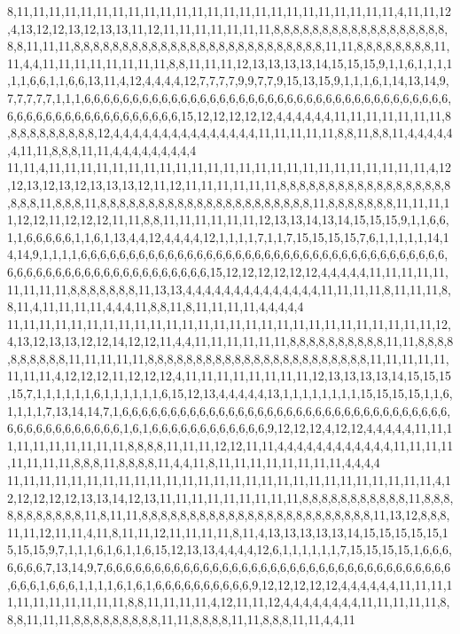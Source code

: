 8,11,11,11,11,11,11,11,11,11,11,11,11,11,11,11,11,11,11,11,11,11,11,11,11,4,11,11,12,4,13,12,12,13,12,13,13,11,12,11,11,11,11,11,11,11,8,8,8,8,8,8,8,8,8,8,8,8,8,8,8,8,8,8,8,8,11,11,11,8,8,8,8,8,8,8,8,8,8,8,8,8,8,8,8,8,8,8,8,8,8,8,8,8,8,11,11,8,8,8,8,8,8,8,8,11,11,4,4,11,11,11,11,11,11,11,11,8,8,11,11,11,12,13,13,13,13,14,15,15,15,9,1,1,6,1,1,1,1,1,1,6,6,1,1,6,6,13,11,4,12,4,4,4,4,12,7,7,7,7,9,9,7,7,9,15,13,15,9,1,1,1,6,1,14,13,14,9,7,7,7,7,7,1,1,1,6,6,6,6,6,6,6,6,6,6,6,6,6,6,6,6,6,6,6,6,6,6,6,6,6,6,6,6,6,6,6,6,6,6,6,6,6,6,6,6,6,6,6,6,6,6,6,6,6,6,6,6,6,6,6,6,15,12,12,12,12,12,4,4,4,4,4,4,11,11,11,11,11,11,11,8,8,8,8,8,8,8,8,8,8,12,4,4,4,4,4,4,4,4,4,4,4,4,4,4,4,11,11,11,11,11,8,8,11,8,8,11,4,4,4,4,4,4,11,11,8,8,8,11,11,4,4,4,4,4,4,4,4,4
11,11,4,11,11,11,11,11,11,11,11,11,11,11,11,11,11,11,11,11,11,11,11,11,11,11,11,4,12,12,13,12,13,12,13,13,13,12,11,12,11,11,11,11,11,11,8,8,8,8,8,8,8,8,8,8,8,8,8,8,8,8,8,8,8,8,8,11,8,8,8,11,8,8,8,8,8,8,8,8,8,8,8,8,8,8,8,8,8,8,8,8,8,8,11,8,8,8,8,8,8,8,11,11,11,11,12,12,11,12,12,12,11,11,8,8,11,11,11,11,11,11,12,13,13,14,13,14,15,15,15,9,1,1,6,6,1,1,6,6,6,6,6,1,1,6,1,13,4,4,12,4,4,4,4,12,1,1,1,1,7,1,1,7,15,15,15,15,7,6,1,1,1,1,1,14,14,14,9,1,1,1,1,6,6,6,6,6,6,6,6,6,6,6,6,6,6,6,6,6,6,6,6,6,6,6,6,6,6,6,6,6,6,6,6,6,6,6,6,6,6,6,6,6,6,6,6,6,6,6,6,6,6,6,6,6,6,6,6,6,6,6,15,12,12,12,12,12,12,4,4,4,4,4,11,11,11,11,11,11,11,11,11,8,8,8,8,8,8,8,11,13,13,4,4,4,4,4,4,4,4,4,4,4,4,4,4,11,11,11,11,8,11,11,11,8,8,11,4,11,11,11,11,4,4,4,11,8,8,11,8,11,11,11,11,4,4,4,4,4
11,11,11,11,11,11,11,11,11,11,11,11,11,11,11,11,11,11,11,11,11,11,11,11,11,11,11,12,4,13,12,13,13,12,12,14,12,12,11,4,4,11,11,11,11,11,11,8,8,8,8,8,8,8,8,8,8,11,11,8,8,8,8,8,8,8,8,8,8,11,11,11,11,11,8,8,8,8,8,8,8,8,8,8,8,8,8,8,8,8,8,8,8,8,8,8,8,11,11,11,11,11,11,11,11,4,12,12,12,11,12,12,12,4,11,11,11,11,11,11,11,11,12,13,13,13,13,14,15,15,15,15,7,1,1,1,1,1,1,6,1,1,1,1,1,1,6,15,12,13,4,4,4,4,4,13,1,1,1,1,1,1,1,1,15,15,15,15,1,1,6,1,1,1,1,7,13,14,14,7,1,6,6,6,6,6,6,6,6,6,6,6,6,6,6,6,6,6,6,6,6,6,6,6,6,6,6,6,6,6,6,6,6,6,6,6,6,6,6,6,6,6,6,6,6,6,6,1,6,1,6,6,6,6,6,6,6,6,6,6,6,6,9,12,12,12,4,12,12,4,4,4,4,4,11,11,11,11,11,11,11,11,11,11,8,8,8,8,11,11,11,12,12,11,11,4,4,4,4,4,4,4,4,4,4,4,4,11,11,11,11,11,11,11,11,8,8,8,11,8,8,8,8,11,4,4,11,8,11,11,11,11,11,11,11,11,4,4,4,4
11,11,11,11,11,11,11,11,11,11,11,11,11,11,11,11,11,11,11,11,11,11,11,11,11,11,11,4,12,12,12,12,12,13,13,14,12,13,11,11,11,11,11,11,11,11,11,8,8,8,8,8,8,8,8,8,8,8,11,8,8,8,8,8,8,8,8,8,8,8,11,8,11,11,8,8,8,8,8,8,8,8,8,8,8,8,8,8,8,8,8,8,8,8,8,8,8,8,11,13,12,8,8,8,11,11,12,11,11,4,11,8,11,11,12,11,11,11,11,8,11,4,13,13,13,13,13,14,15,15,15,15,15,15,15,15,9,7,1,1,1,6,1,6,1,1,6,15,12,13,13,4,4,4,4,12,6,1,1,1,1,1,1,7,15,15,15,15,1,6,6,6,6,6,6,6,7,13,14,9,7,6,6,6,6,6,6,6,6,6,6,6,6,6,6,6,6,6,6,6,6,6,6,6,6,6,6,6,6,6,6,6,6,6,6,6,6,6,6,6,1,6,6,6,1,1,1,1,6,1,6,1,6,6,6,6,6,6,6,6,6,6,9,12,12,12,12,12,4,4,4,4,4,4,11,11,11,11,11,11,11,11,11,11,11,8,8,11,11,11,11,4,12,11,11,12,4,4,4,4,4,4,4,4,11,11,11,11,11,8,8,8,11,11,11,8,8,8,8,8,8,8,8,8,11,11,8,8,8,8,11,11,8,8,8,11,11,4,4,11
